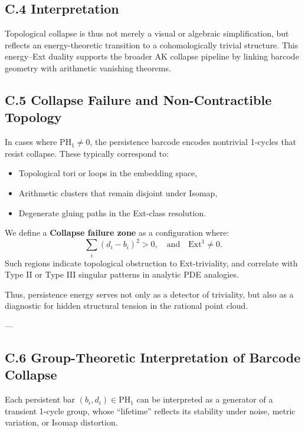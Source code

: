 \subsection*{C.4 Interpretation}

Topological collapse is thus not merely a visual or algebraic simplification,  
but reflects an energy-theoretic transition to a cohomologically trivial structure.  
This energy–Ext duality supports the broader AK collapse pipeline  
by linking barcode geometry with arithmetic vanishing theorems.

\subsection*{C.5 Collapse Failure and Non-Contractible Topology}

In cases where \( \mathrm{PH}_1 \neq 0 \), the persistence barcode encodes  
nontrivial 1-cycles that resist collapse. These typically correspond to:

\begin{itemize}
  \item Topological tori or loops in the embedding space,
  \item Arithmetic clusters that remain disjoint under Isomap,
  \item Degenerate gluing paths in the Ext-class resolution.
\end{itemize}

\begin{definition}
We define a \textbf{Collapse failure zone} as a configuration where:
\[
\sum_i (d_i - b_i)^2 > 0,
\quad \text{and} \quad \mathrm{Ext}^1 \neq 0.
\]
Such regions indicate topological obstruction to Ext-triviality, and correlate with  
Type II or Type III singular patterns in analytic PDE analogies.
\end{definition}

Thus, persistence energy serves not only as a detector of triviality,  
but also as a diagnostic for hidden structural tension in the rational point cloud.

---

\subsection*{C.6 Group-Theoretic Interpretation of Barcode Collapse}

Each persistent bar \( (b_i, d_i) \in \mathrm{PH}_1 \) can be interpreted  
as a generator of a transient 1-cycle group, whose “lifetime” reflects its stability  
under noise, metric variation, or Isomap distortion.

